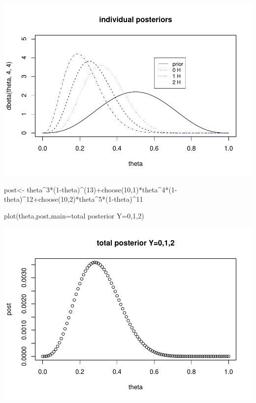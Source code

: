 \documentclass[
]{book}
\newenvironment{Shaded}{\begin{snugshade}}{\end{snugshade}}
\newcommand{\AttributeTok}[1]{\textcolor[rgb]{0.77,0.63,0.00}{#1}}
\newcommand{\DecValTok}[1]{\textcolor[rgb]{0.00,0.00,0.81}{#1}}
\newcommand{\FunctionTok}[1]{\textcolor[rgb]{0.00,0.00,0.00}{#1}}
\newcommand{\NormalTok}[1]{#1}
\newcommand{\OtherTok}[1]{\textcolor[rgb]{0.56,0.35,0.01}{#1}}
\newcommand{\SpecialCharTok}[1]{\textcolor[rgb]{0.00,0.00,0.00}{#1}}
\newcommand{\StringTok}[1]{\textcolor[rgb]{0.31,0.60,0.02}{#1}}
\theoremstyle{definition}
\theoremstyle{definition}
\theoremstyle{definition}
\theoremstyle{definition}
\theoremstyle{remark}
\begin{document}
\includegraphics{_main_files/figure-latex/unnamed-chunk-11-1.pdf}

\begin{Shaded}
\begin{Highlighting}[]
\NormalTok{post}\OtherTok{\textless{}{-}}\NormalTok{ theta}\SpecialCharTok{\^{}}\DecValTok{3}\SpecialCharTok{*}\NormalTok{(}\DecValTok{1}\SpecialCharTok{{-}}\NormalTok{theta)}\SpecialCharTok{\^{}}\NormalTok{(}\DecValTok{13}\NormalTok{)}\SpecialCharTok{+}\FunctionTok{choose}\NormalTok{(}\DecValTok{10}\NormalTok{,}\DecValTok{1}\NormalTok{)}\SpecialCharTok{*}\NormalTok{theta}\SpecialCharTok{\^{}}\DecValTok{4}\SpecialCharTok{*}\NormalTok{(}\DecValTok{1}\SpecialCharTok{{-}}\NormalTok{theta)}\SpecialCharTok{\^{}}\DecValTok{12}\SpecialCharTok{+}\FunctionTok{choose}\NormalTok{(}\DecValTok{10}\NormalTok{,}\DecValTok{2}\NormalTok{)}\SpecialCharTok{*}\NormalTok{theta}\SpecialCharTok{\^{}}\DecValTok{5}\SpecialCharTok{*}\NormalTok{(}\DecValTok{1}\SpecialCharTok{{-}}\NormalTok{theta)}\SpecialCharTok{\^{}}\DecValTok{11}

\FunctionTok{plot}\NormalTok{(theta,post,}\AttributeTok{main=}\StringTok{\textquotesingle{}total posterior Y=0,1,2\textquotesingle{}}\NormalTok{)}
\end{Highlighting}
\end{Shaded}

\includegraphics{_main_files/figure-latex/unnamed-chunk-11-2.pdf}
\end{document}
